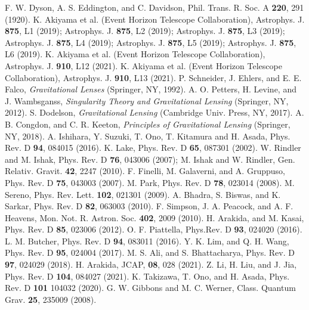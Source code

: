 \documentclass[twocolumn,showpacs,preprintnumbers,amsmath,amssymb]{revtex4-1}
\begin{document}
\begin{thebibliography}{99}
F. W. Dyson, A. S. Eddington, and C. Davidson, Phil. Trans.
R. Soc. A {\bf 220}, 291 (1920). 
K. Akiyama et al. (Event Horizon Telescope Collaboration), 
Astrophys. J. {\bf 875}, L1 (2019);
Astrophys. J. {\bf 875}, L2 (2019); 
Astrophys. J. {\bf 875}, L3 (2019); 
Astrophys. J. {\bf 875}, L4 (2019); 
Astrophys. J. {\bf 875}, L5 (2019); 
Astrophys. J. {\bf 875}, L6 (2019). 
K. Akiyama et al. (Event Horizon Telescope Collaboration), 
Astrophys. J. {\bf 910}, L12 (2021).
K. Akiyama et al. (Event Horizon Telescope Collaboration), 
Astrophys. J. {\bf 910}, L13 (2021).
P. Schneider, J. Ehlers, and E. E. Falco, 
{\it Gravitational Lenses} 
(Springer, NY, 1992). 
A. O. Petters, H. Levine, and J. Wambsganss, 
{\it Singularity Theory and Gravitational Lensing} 
(Springer, NY, 2012). 
S. Dodelson,
{\it Gravitational Lensing} 
(Cambridge Univ. Press, NY, 2017). 
A. B. Congdon, and C. R. Keeton, 
{\it Principles of Gravitational Lensing} 
(Springer, NY, 2018). 
A. Ishihara, Y. Suzuki, T. Ono, T. Kitamura and H. Asada, Phys. Rev. D {\bf 94},
 084015 (2016).
K. Lake, Phys. Rev. D {\bf 65}, 087301 (2002).
W. Rindler and M. Ishak, Phys. Rev. D {\bf 76}, 043006 (2007); 
M. Ishak and W. Rindler, Gen. Relativ. Gravit. 
{\bf 42}, 2247 (2010).
F. Finelli, M. Galaverni, and A. Gruppuso, 
Phys. Rev. D {\bf 75}, 043003 (2007). 
M. Park, Phys. Rev. D {\bf 78}, 023014 (2008).
M. Sereno, Phys. Rev. Lett. {\bf 102}, 021301 (2009).
A. Bhadra, S. Biswas, and K. Sarkar, Phys. Rev. D {\bf 82}, 063003 (2010).
F. Simpson, J. A. Peacock, and A. F. Heavens, Mon. Not.
R. Astron. Soc. {\bf 402}, 2009 (2010).
H. Arakida, and M. Kasai, 
Phys. Rev. D {\bf 85}, 023006 (2012).
O. F. Piattella, 
Phys.Rev. D {\bf 93}, 024020 (2016).
L. M. Butcher, 
Phys. Rev. D {\bf 94}, 083011 (2016).
Y. K. Lim, and Q. H. Wang, 
Phys. Rev. D {\bf 95}, 024004 (2017).
M. S. Ali, and S. Bhattacharya, 
Phys. Rev. D {\bf 97}, 024029 (2018).
H. Arakida, 
JCAP, {\bf 08}, 028 (2021). 
Z. Li, H. Liu, and J. Jia, 
Phys. Rev. D {\bf 104}, 084027 (2021). 
K. Takizawa, T. Ono, and H. Asada, Phys. Rev. D {\bf 101} 104032 (2020). 
G. W. Gibbons and M. C. Werner, Class. Quantum Grav. {\bf 25}, 235009 (2008). 

\end{thebibliography}
\end{document}
